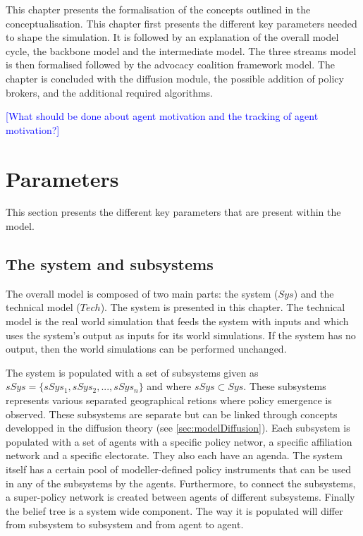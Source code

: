 This chapter presents the formalisation of the concepts outlined in the conceptualisation. This chapter first presents the different key parameters needed to shape the simulation. It is followed by an explanation of the overall model cycle, the backbone model and the intermediate model. The three streams model is then formalised followed by the advocacy coalition framework model. The chapter is concluded with the diffusion module, the possible addition of policy brokers, and the additional required algorithms.


\textcolor{blue}{[What should be done about agent motivation and the tracking of agent motivation?]}


\section{Parameters}
\label{sec:parameters}

This section presents the different key parameters that are present within the model. 

\subsection{The system and subsystems}

The overall model is composed of two main parts: the system ($Sys$) and the technical model ($Tech$). The system is presented in this chapter. The technical model is the real world simulation that feeds the system with inputs and which uses the system's output as inputs for its world simulations. If the system has no output, then the world simulations can be performed unchanged.

The system is populated with a set of subsystems given as $sSys = \{sSys_1, sSys_2, ..., sSys_n\}$ and where $sSys \subset Sys$. These subsystems represents various separated geographical retions where policy emergence is observed. These subsystems are separate but can be linked through concepts developped in the diffusion theory (see \autoref{sec:modelDiffusion}). Each subsystem is populated with a set of agents with a specific policy networ, a specific affiliation network and a specific electorate. They also each have an agenda. The system itself has a certain pool of modeller-defined policy instruments that can be used in any of the subsystems by the agents. Furthermore, to connect the subsystems, a super-policy network is created between agents of different subsystems. Finally the belief tree is a system wide component. The way it is populated will differ from subsystem to subsystem and from agent to agent.


